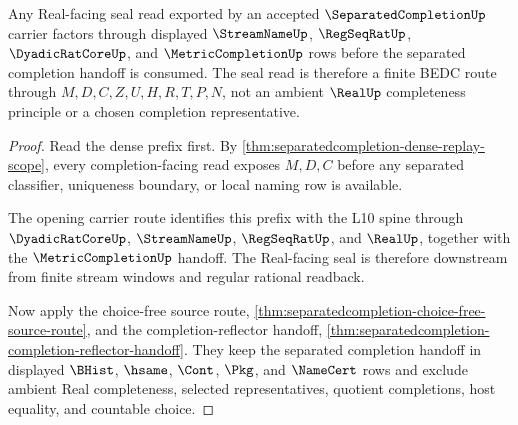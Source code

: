 \begin{theorem}
\label{thm:separated-completion-real-seal-root-obligation}
Any Real-facing seal read exported by an accepted $\SeparatedCompletionUp$ carrier factors through displayed $\StreamNameUp$, $\RegSeqRatUp$, $\DyadicRatCoreUp$, and $\MetricCompletionUp$ rows before the separated completion handoff is consumed. The seal read is therefore a finite BEDC route through $M,D,C,Z,U,H,R,T,P,N$, not an ambient $\RealUp$ completeness principle or a chosen completion representative.
\end{theorem}
\begin{proof}
Read the dense prefix first. By \autoref{thm:separatedcompletion-dense-replay-scope}, every completion-facing read exposes $M,D,C$ before any separated classifier, uniqueness boundary, or local naming row is available.

The opening carrier route identifies this prefix with the L10 spine through $\DyadicRatCoreUp$, $\StreamNameUp$, $\RegSeqRatUp$, and $\RealUp$, together with the $\MetricCompletionUp$ handoff. The Real-facing seal is therefore downstream from finite stream windows and regular rational readback.

Now apply the choice-free source route, \autoref{thm:separatedcompletion-choice-free-source-route}, and the completion-reflector handoff, \autoref{thm:separatedcompletion-completion-reflector-handoff}. They keep the separated completion handoff in displayed $\BHist$, $\hsame$, $\Cont$, $\Pkg$, and $\NameCert$ rows and exclude ambient Real completeness, selected representatives, quotient completions, host equality, and countable choice.
\end{proof}

